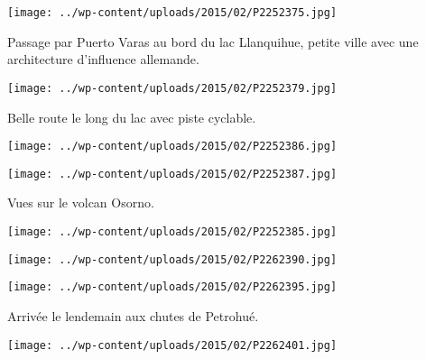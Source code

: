  

\begin{center} \texttt{[image: ../wp-content/uploads/2015/02/P2252375.jpg]} \end{center}



 Passage par Puerto Varas au bord du lac Llanquihue, petite ville avec une architecture d'influence allemande.

 

\begin{center} \texttt{[image: ../wp-content/uploads/2015/02/P2252379.jpg]} \end{center}



 Belle route le long du lac avec piste cyclable.

 

\begin{center} \texttt{[image: ../wp-content/uploads/2015/02/P2252386.jpg]} \end{center}

 

\begin{center} \texttt{[image: ../wp-content/uploads/2015/02/P2252387.jpg]} \end{center}



 Vues sur le volcan Osorno.

 

\begin{center} \texttt{[image: ../wp-content/uploads/2015/02/P2252385.jpg]} \end{center}



 

\begin{center} \texttt{[image: ../wp-content/uploads/2015/02/P2262390.jpg]} \end{center}

 

\begin{center} \texttt{[image: ../wp-content/uploads/2015/02/P2262395.jpg]} \end{center}

Arrivée le lendemain aux chutes de Petrohué.

 

\begin{center} \texttt{[image: ../wp-content/uploads/2015/02/P2262401.jpg]} \end{center}

